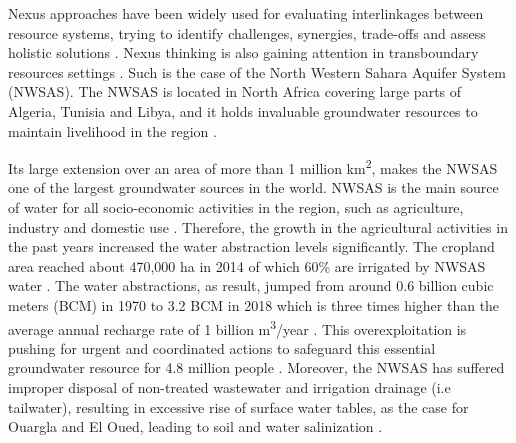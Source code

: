 Nexus approaches have been widely used for evaluating interlinkages between resource systems, trying to identify challenges, synergies, trade-offs and assess holistic solutions \cite{hoffNexusApproachMENA2019,kingRapidAssessmentWater2015}. Nexus thinking is also gaining attention in transboundary resources settings \cite{uneceReconcilingResourceUses2015,kingRapidAssessmentWater2015}. Such is the case of the North Western Sahara Aquifer System (NWSAS). The NWSAS is located in North Africa covering large parts of Algeria, Tunisia and Libya, and it holds invaluable groundwater resources to maintain livelihood in the region \cite{BetterValorizationIrrigation2015}.

Its large extension over an area of more than 1 million km\textsuperscript{2}, makes the NWSAS one of the largest groundwater sources in the world. NWSAS is the main source of water for all socio-economic activities in the region, such as agriculture, industry and domestic use \cite{almullaNWSAS}. Therefore, the growth in the agricultural activities in the past years increased the water abstraction levels significantly. The cropland area reached about 470,000 ha in 2014 \cite{Socioeconomicaspectsirrigation2014} of which 60\% are irrigated by NWSAS water \cite{almullaNWSAS}. The water abstractions, as result, jumped from around 0.6 billion cubic meters (BCM) in 1970 \cite{BetterValorizationIrrigation2015} to 3.2 BCM in 2018 \cite{almullaNWSAS} which is three times higher than the average annual recharge rate of 1 billion m\textsuperscript{3}/year \cite{unepProtectionNorthWest2010}. This overexploitation is pushing for urgent and coordinated actions to safeguard this essential groundwater resource for 4.8 million people \cite{uneceReconcilingResourceUses2020}. Moreover, the NWSAS has suffered improper disposal of non-treated wastewater and irrigation drainage (i.e tailwater), resulting in excessive rise of surface water tables, as the case for Ouargla and El Oued, leading to soil and water salinization \cite{BetterValorizationIrrigation2015}.


